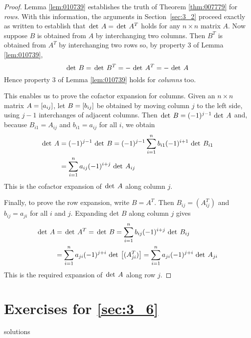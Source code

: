\begin{proof}
Lemma \ref{lem:010739} establishes the truth of Theorem \ref{thm:007779} for \textit{rows}. With this information, the arguments in Section~\ref{sec:3_2} proceed exactly as written to establish that $\thinspace\operatorname{det \medspace}A = \thinspace\operatorname{det \medspace}A^{T}$ holds for any $n \times n$ matrix $A$. Now suppose $B$ is obtained from $A$ by interchanging two columns. Then $B^{T}$ is obtained from $A^{T}$ by interchanging two rows so, by property 3 of Lemma \ref{lem:010739},
\begin{equation*}
\thinspace\operatorname{det \medspace} B = \thinspace\operatorname{det \medspace} B^T = -\thinspace\operatorname{det \medspace} A^T = -\thinspace\operatorname{det \medspace} A
\end{equation*}
Hence property 3 of Lemma \ref{lem:010739} holds for \textit{columns} too.


This enables us to prove the cofactor expansion for columns. Given an $n \times n$ matrix $A = \left[ a_{ij} \right]$, let $B = \left[ b_{ij} \right]$ be obtained by moving column $j$ to the left side, using $j - 1$ interchanges of adjacent columns. Then $\thinspace\operatorname{det \medspace}B = (-1)^{j-1} \thinspace\operatorname{det \medspace}A$ and, because $B_{i1} = A_{ij}$ and $b_{i1} = a_{ij}$ for all $i$, we obtain
\begin{align*}
\thinspace\operatorname{det \medspace} A & = (-1)^{j-1} \thinspace\operatorname{det \medspace} B = (-1)^{j-1} \sum_{i=1}^n b_{i1}(-1)^{i+1} \thinspace\operatorname{det \medspace} B_{i1}\\
&= \sum_{i=1}^n a_{ij} (-1)^{i+j} \thinspace\operatorname{det \medspace} A_{ij}
\end{align*}
This is the cofactor expansion of $\thinspace\operatorname{det \medspace}A$ along column $j$.


Finally, to prove the row expansion, write $B = A^{T}$. Then $B_{ij} = (A_{ij}^T)$ and $b_{ij} = a_{ji}$ for all $i$ and $j$. Expanding det $B$ along column $j$ gives
\begin{align*}
\thinspace\operatorname{det \medspace} A &=\thinspace\operatorname{det \medspace} A^T = \thinspace\operatorname{det \medspace} B = \sum_{i=1}^n b_{ij} (-1)^{i+j} \thinspace\operatorname{det \medspace} B_{ij} \\
&= \sum_{i=1}^n a_{ji}(-1)^{j+i} \thinspace\operatorname{det\medspace} \left[ (A_{ji}^T)\right] = \sum_{i=1}^n a_{ji} (-1)^{j+i} \thinspace\operatorname{det \medspace} A_{ji}
\end{align*}
This is the required expansion of $\thinspace\operatorname{det \medspace}A$ along row $j$.
\end{proof}

\vspace{-2em}
\section*{Exercises for \ref{sec:3_6}}

\begin{Filesave}{solutions}
\end{Filesave}

